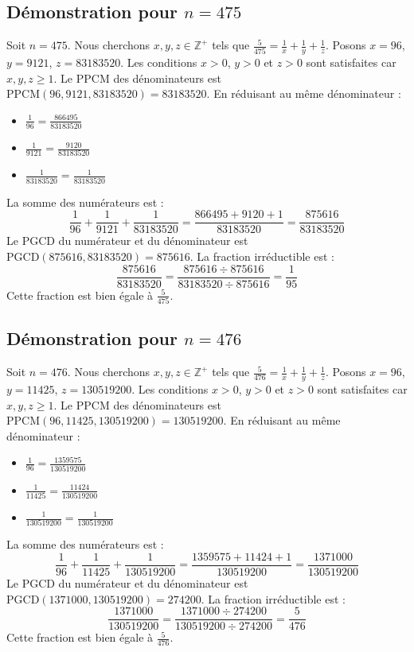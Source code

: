 \documentclass[11pt,a4paper]{article}
\begin{document}
\subsection{Démonstration pour $n = 475$}
Soit $n = 475$. Nous cherchons $x, y, z \in \mathbb{Z}^{+}$ tels que $\frac{5}{475} = \frac{1}{x} + \frac{1}{y} + \frac{1}{z}$.
Posons $x = 96$, $y = 9121$, $z = 83183520$.
Les conditions $x > 0$, $y > 0$ et $z > 0$ sont satisfaites car $x, y, z \geq 1$.
Le PPCM des dénominateurs est $\text{PPCM}(96, 9121, 83183520) = 83183520$.
En réduisant au même dénominateur :
\begin{itemize}
    \item $\frac{1}{96} = \frac{866495}{83183520}$
    \item $\frac{1}{9121} = \frac{9120}{83183520}$
    \item $\frac{1}{83183520} = \frac{1}{83183520}$
\end{itemize}
La somme des numérateurs est :
$$ \frac{1}{96} + \frac{1}{9121} + \frac{1}{83183520} = \frac{866495 + 9120 + 1}{83183520} = \frac{875616}{83183520} $$
Le PGCD du numérateur et du dénominateur est $\text{PGCD}(875616, 83183520) = 875616$.
La fraction irréductible est :
$$ \frac{875616}{83183520} = \frac{875616 \div 875616}{83183520 \div 875616} = \frac{1}{95} $$
Cette fraction est bien égale à $\frac{5}{475}$.

\subsection{Démonstration pour $n = 476$}
Soit $n = 476$. Nous cherchons $x, y, z \in \mathbb{Z}^{+}$ tels que $\frac{5}{476} = \frac{1}{x} + \frac{1}{y} + \frac{1}{z}$.
Posons $x = 96$, $y = 11425$, $z = 130519200$.
Les conditions $x > 0$, $y > 0$ et $z > 0$ sont satisfaites car $x, y, z \geq 1$.
Le PPCM des dénominateurs est $\text{PPCM}(96, 11425, 130519200) = 130519200$.
En réduisant au même dénominateur :
\begin{itemize}
    \item $\frac{1}{96} = \frac{1359575}{130519200}$
    \item $\frac{1}{11425} = \frac{11424}{130519200}$
    \item $\frac{1}{130519200} = \frac{1}{130519200}$
\end{itemize}
La somme des numérateurs est :
$$ \frac{1}{96} + \frac{1}{11425} + \frac{1}{130519200} = \frac{1359575 + 11424 + 1}{130519200} = \frac{1371000}{130519200} $$
Le PGCD du numérateur et du dénominateur est $\text{PGCD}(1371000, 130519200) = 274200$.
La fraction irréductible est :
$$ \frac{1371000}{130519200} = \frac{1371000 \div 274200}{130519200 \div 274200} = \frac{5}{476} $$
Cette fraction est bien égale à $\frac{5}{476}$.
\end{document}
